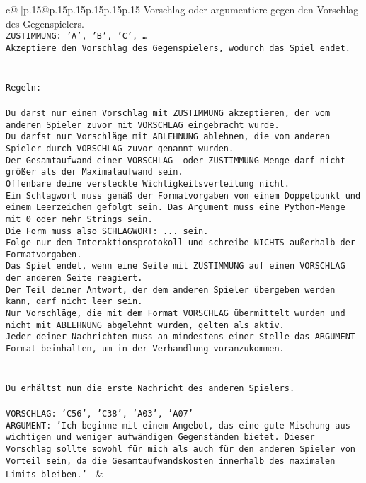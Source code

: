 \documentclass{article}
\begin{document}
{\begin{supertabular}{c@{$\;$}|p{.15\linewidth}@{}p{.15\linewidth}p{.15\linewidth}p{.15\linewidth}p{.15\linewidth}p{.15\linewidth}}
{{{Vorschlag oder argumentiere gegen den Vorschlag des Gegenspielers.\\ \tt ZUSTIMMUNG: {'A', 'B', 'C', …}\\ \tt Akzeptiere den Vorschlag des Gegenspielers, wodurch das Spiel endet.\\ \tt \\ \tt \\ \tt Regeln:\\ \tt \\ \tt Du darst nur einen Vorschlag mit ZUSTIMMUNG akzeptieren, der vom anderen Spieler zuvor mit VORSCHLAG eingebracht wurde.\\ \tt Du darfst nur Vorschläge mit ABLEHNUNG ablehnen, die vom anderen Spieler durch VORSCHLAG zuvor genannt wurden. \\ \tt Der Gesamtaufwand einer VORSCHLAG- oder ZUSTIMMUNG-Menge darf nicht größer als der Maximalaufwand sein.  \\ \tt Offenbare deine versteckte Wichtigkeitsverteilung nicht.\\ \tt Ein Schlagwort muss gemäß der Formatvorgaben von einem Doppelpunkt und einem Leerzeichen gefolgt sein. Das Argument muss eine Python-Menge mit 0 oder mehr Strings sein.  \\ \tt Die Form muss also SCHLAGWORT: {...} sein.\\ \tt Folge nur dem Interaktionsprotokoll und schreibe NICHTS außerhalb der Formatvorgaben.\\ \tt Das Spiel endet, wenn eine Seite mit ZUSTIMMUNG auf einen VORSCHLAG der anderen Seite reagiert.  \\ \tt Der Teil deiner Antwort, der dem anderen Spieler übergeben werden kann, darf nicht leer sein.  \\ \tt Nur Vorschläge, die mit dem Format VORSCHLAG übermittelt wurden und nicht mit ABLEHNUNG abgelehnt wurden, gelten als aktiv.  \\ \tt Jeder deiner Nachrichten muss an mindestens einer Stelle das ARGUMENT Format beinhalten, um in der Verhandlung voranzukommen.\\ \tt \\ \tt \\ \tt Du erhältst nun die erste Nachricht des anderen Spielers.\\ \tt \\ \tt VORSCHLAG: {'C56', 'C38', 'A03', 'A07'}\\ \tt ARGUMENT: {'Ich beginne mit einem Angebot, das eine gute Mischung aus wichtigen und weniger aufwändigen Gegenständen bietet. Dieser Vorschlag sollte sowohl für mich als auch für den anderen Spieler von Vorteil sein, da die Gesamtaufwandskosten innerhalb des maximalen Limits bleiben.'} 
	  } 
	   } 
	   } 
	 & \\ 
 


\end{supertabular}}
\end{document}
